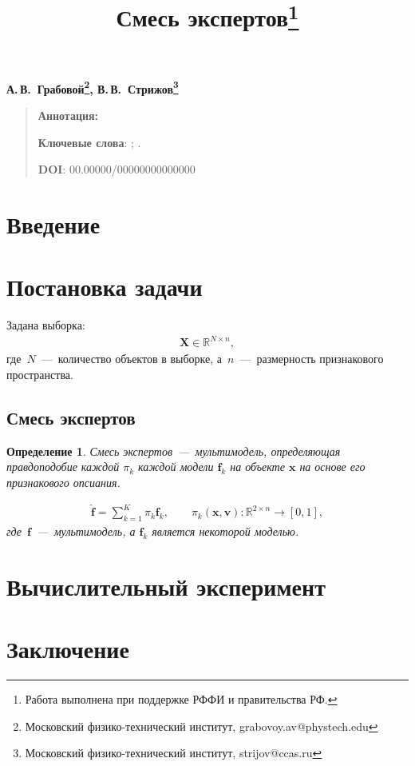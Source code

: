 \documentclass[12pt, twoside]{article}
\newtheorem{definition}{Определение}[section]
\numberwithin{equation}{section}
\begin{document}
\title{\bf Смесь экспертов\thanks{Работа выполнена при поддержке РФФИ и правительства РФ.}}
\date{}
\author{}
\maketitle

\begin{center}
\bf
А.\,В.~Грабовой\footnote{Московский физико-технический институт, grabovoy.av@phystech.edu}, В.\,В.~Стрижов\footnote{Московский физико-технический институт, strijov@ccas.ru}

\end{center}

{\centering\begin{quote}
\textbf{Аннотация:} 


\smallskip
\textbf{Ключевые слова}: ; .

\smallskip
\textbf{DOI}: 00.00000/00000000000000
\end{quote}
}

\section{Введение}

\section{Постановка задачи}

Задана выборка:
\begin{equation}
\label{eq:st:1}
\begin{aligned}
\textbf{X} \in \mathbb{R}^{N \times n},
\end{aligned}
\end{equation}
где~$N$~---~количество объектов в выборке, а~$n$~---~размерность признакового пространства.

\subsection{Смесь экспертов}
\begin{definition}
Смесь экспертов~---~мультимодель, определяющая правдоподобие каждой $\pi_k$ каждой модели $\textbf{f}_k$ на объекте $\textbf{x}$ на основе его признакового опсиания.

\begin{equation}
\label{eq:st:1}
\begin{aligned}
\hat{\textbf{f}} = \sum_{k=1}^{K}\pi_{k}\textbf{f}_k, \qquad \pi_{k}\left(\textbf{x}, \textbf{v}\right):\mathbb{R}^{2\times n} \to [0, 1],
\end{aligned}
\end{equation}
где~$\textbf{f}$~---~мультимодель, а $\textbf{f}_k$ является некоторой моделью.
\end{definition}

\section{Вычислительный эксперимент}

\section{Заключение}

\begin{thebibliography}{99}

\end{thebibliography}
\end{document}
